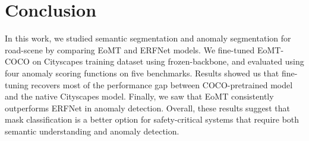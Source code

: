 \section{Conclusion}
\label{sec:conclusion}

In this work, we studied semantic segmentation and anomaly segmentation for road-scene by comparing EoMT and ERFNet models.
We fine-tuned EoMT-COCO on Cityscapes training dataset using frozen-backbone, and evaluated using four anomaly scoring functions on five benchmarks.
Results showed us that fine-tuning recovers most of the performance gap between COCO-pretrained model and the native Cityscapes model.
Finally, we saw that EoMT consistently outperforms ERFNet in anomaly detection. 
Overall, these results suggest that mask classification is a better option for safety-critical systems that require both semantic understanding and anomaly detection.